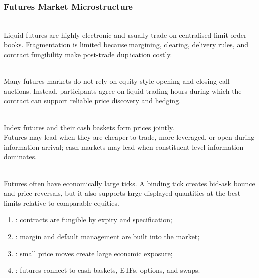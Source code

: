 \subsubsection{Futures Market Microstructure}

\begin{principle} \\
Liquid futures are highly electronic and usually trade on centralised limit order books. Fragmentation is limited because margining, clearing, delivery rules, and contract fungibility make post-trade duplication costly.
\end{principle}

\begin{caveat} \\
Many futures markets do not rely on equity-style opening and closing call auctions. Instead, participants agree on liquid trading hours during which the contract can support reliable price discovery and hedging.
\end{caveat}

\begin{mechanism} \\
Index futures and their cash baskets form prices jointly.\\
Futures may lead when they are cheaper to trade, more leveraged, or open during information arrival; cash markets may lead when constituent-level information dominates.
\end{mechanism}

\begin{principle} \\
Futures often have economically large ticks. A binding tick creates bid-ask bounce and price reversals, but it also supports large displayed quantities at the best limits relative to comparable equities.
\end{principle}

\begin{taxonomy} 
\begin{enumerate}[label=\roman*.]
\setlength{\itemsep}{0pt}
\item {}: contracts are fungible by expiry and specification;
\item {}: margin and default management are built into the market;
\item {}: small price moves create large economic exposure;
\item {}: futures connect to cash baskets, ETFs, options, and swaps.
\end{enumerate}
\end{taxonomy}

